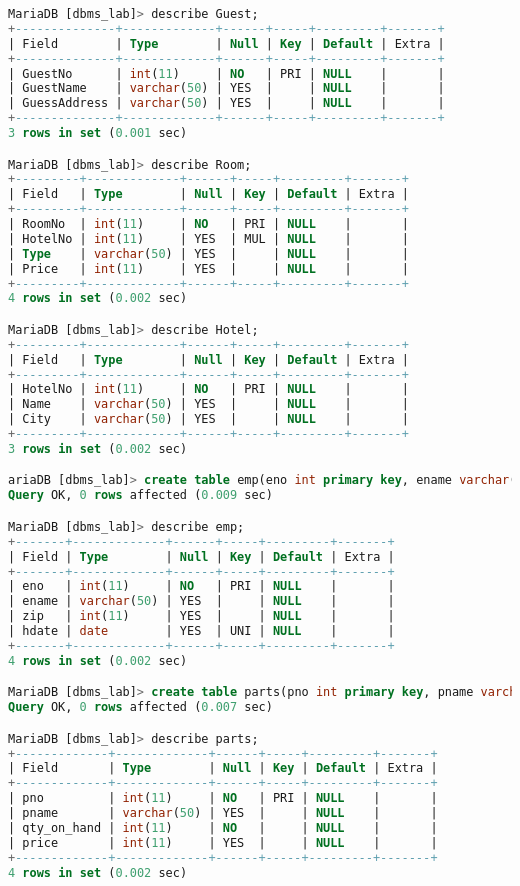 \documentclass{article}
\begin{document}
\begin{lstlisting}[language=SQL]
MariaDB [dbms_lab]> describe Guest;
+--------------+-------------+------+-----+---------+-------+
| Field        | Type        | Null | Key | Default | Extra |
+--------------+-------------+------+-----+---------+-------+
| GuestNo      | int(11)     | NO   | PRI | NULL    |       |
| GuestName    | varchar(50) | YES  |     | NULL    |       |
| GuessAddress | varchar(50) | YES  |     | NULL    |       |
+--------------+-------------+------+-----+---------+-------+
3 rows in set (0.001 sec)

MariaDB [dbms_lab]> describe Room;
+---------+-------------+------+-----+---------+-------+
| Field   | Type        | Null | Key | Default | Extra |
+---------+-------------+------+-----+---------+-------+
| RoomNo  | int(11)     | NO   | PRI | NULL    |       |
| HotelNo | int(11)     | YES  | MUL | NULL    |       |
| Type    | varchar(50) | YES  |     | NULL    |       |
| Price   | int(11)     | YES  |     | NULL    |       |
+---------+-------------+------+-----+---------+-------+
4 rows in set (0.002 sec)

MariaDB [dbms_lab]> describe Hotel;
+---------+-------------+------+-----+---------+-------+
| Field   | Type        | Null | Key | Default | Extra |
+---------+-------------+------+-----+---------+-------+
| HotelNo | int(11)     | NO   | PRI | NULL    |       |
| Name    | varchar(50) | YES  |     | NULL    |       |
| City    | varchar(50) | YES  |     | NULL    |       |
+---------+-------------+------+-----+---------+-------+
3 rows in set (0.002 sec)

ariaDB [dbms_lab]> create table emp(eno int primary key, ename varchar(50), zip int check(zip in (400110, 400111)), hdate date unique);
Query OK, 0 rows affected (0.009 sec)

MariaDB [dbms_lab]> describe emp;
+-------+-------------+------+-----+---------+-------+
| Field | Type        | Null | Key | Default | Extra |
+-------+-------------+------+-----+---------+-------+
| eno   | int(11)     | NO   | PRI | NULL    |       |
| ename | varchar(50) | YES  |     | NULL    |       |
| zip   | int(11)     | YES  |     | NULL    |       |
| hdate | date        | YES  | UNI | NULL    |       |
+-------+-------------+------+-----+---------+-------+
4 rows in set (0.002 sec)

MariaDB [dbms_lab]> create table parts(pno int primary key, pname varchar(50), qty_on_hand int not null, price int);
Query OK, 0 rows affected (0.007 sec)

MariaDB [dbms_lab]> describe parts;
+-------------+-------------+------+-----+---------+-------+
| Field       | Type        | Null | Key | Default | Extra |
+-------------+-------------+------+-----+---------+-------+
| pno         | int(11)     | NO   | PRI | NULL    |       |
| pname       | varchar(50) | YES  |     | NULL    |       |
| qty_on_hand | int(11)     | NO   |     | NULL    |       |
| price       | int(11)     | YES  |     | NULL    |       |
+-------------+-------------+------+-----+---------+-------+
4 rows in set (0.002 sec)


\end{lstlisting}
\end{document}
